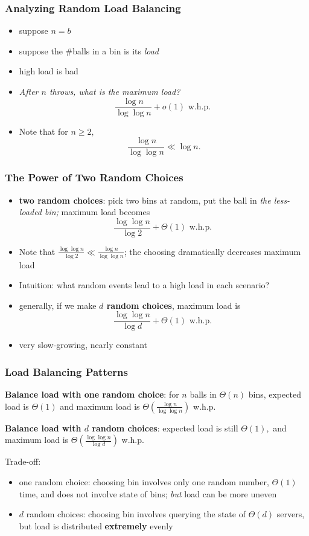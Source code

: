 \documentclass[10pt]{beamer}
\begin{document}
\begin{frame} \frametitle{Analyzing Random Load Balancing}
\begin{itemize}
  \item suppose $n=b$
  \item suppose the \#balls in a bin is its \emph{load}
  \item high load is bad
  \item \emph{After $n$ throws, what is the maximum load?}
    \[ \frac{\log n}{\log \log n} + o(1) \text{ w.h.p. } \]
  \item Note that for $n \geq 2,$
    \[ \frac{\log n}{\log \log n} \ll \log n . \]
\end{itemize}
\end{frame}

\begin{frame} \frametitle{The Power of Two Random Choices}
\begin{itemize}
  \item \textbf{two random choices}: pick two bins at random, put the ball in
    \emph{the less-loaded bin;} maximum load becomes
    \[ \frac{\log \log n}{\log 2} + \Theta(1) \text{ w.h.p. } \]
  \item Note that $\frac{\log \log n}{\log 2} \ll \frac{\log n}{\log \log n}$; the choosing dramatically decreases maximum load
  \item Intuition: what random events lead to a high load in each scenario?
  \item generally, if we make \textbf{$d$ random choices}, maximum load is
    \[ \frac{\log \log n}{\log d} + \Theta(1) \text { w.h.p. } \]
  \item very slow-growing, nearly constant
\end{itemize}
\end{frame}

\begin{frame} \frametitle{Load Balancing Patterns}

\textbf{Balance load with one random choice}: for $n$ balls in $\Theta(n)$ bins,
expected load is $\Theta(1)$ and maximum load is $\Theta(\frac{\log n}{\log \log n})$ w.h.p.
\vspace{.5cm}

\textbf{Balance load with $d$ random choices}: expected load is still $\Theta(1),$
and maximum load is $\Theta(\frac{\log \log n}{\log d})$ w.h.p.
\vspace{.5cm}

Trade-off:
\begin{itemize}
  \item one random choice: choosing bin involves only one random number,
  $\Theta(1)$ time, and
    does not involve state of bins; \emph{but} load can be more uneven
  \item $d$ random choices: choosing bin involves querying the state of $\Theta(d)$ servers, but
  load is distributed \textbf{extremely} evenly
\end{itemize}
\end{frame}
\end{document}
